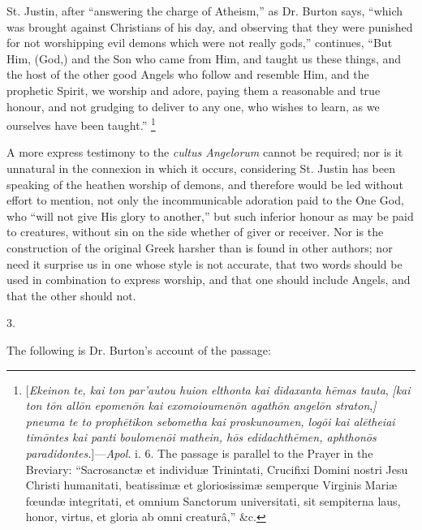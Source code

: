 St. Justin, after ``answering the charge of Atheism,'' as
Dr. Burton says, ``which was brought against Christians of his
day, and observing that they were punished for not worshipping evil
demons which were not really gods,'' continues, ``But Him,
(God,) and the Son who came from Him, and taught us these things, and
the host of the other good Angels who follow and resemble Him, and the
prophetic Spirit, we worship and adore, paying them a reasonable and
true honour, and not grudging to deliver to any one, who wishes to
learn, as we ourselves have been taught.'' \footnote{[\emph{Ekeinon te, kai ton par’autou huion
elthonta kai didaxanta h\={e}mas tauta}, \emph{[kai ton t\={o}n
all\={o}n epomen\={o}n kai exomoioumen\={o}n agath\={o}n
angel\={o}n straton},\emph{]} \emph{pneuma te to proph\={e}tikon
sebometha kai proskunoumen, log\={o}i kai al\={e}theiai tim\={o}ntes
kai panti boulomen\={o}i mathein, h\={o}s edidachth\={e}men,
aphthon\={o}s paradidontes.}]—\emph{Apol}.
i. 6. The passage is parallel to the Prayer in the Breviary: ``Sacrosanctæ
et individuæ Trinintati, Crucifixi Domini nostri Jesu Christi
humanitati, beatissimæ et gloriosissimæ semperque Virginis Mariæ fœundæ
integritati, et omnium Sanctorum universitati, sit sempiterna
laus, honor, virtus, et gloria ab omni creaturâ,'' \&c.}

A more express testimony to the \emph{cultus Angelorum} cannot
be
required; nor is it unnatural in the connexion in which it occurs,
considering St. Justin has been speaking of the heathen worship of
demons, and therefore would be led without effort to mention, not only
the incommunicable adoration paid to the One God, who ``will not
give His glory to another,'' but such inferior honour as may be
paid to creatures, without sin on the side whether of giver or
receiver. Nor is the construction of the original Greek harsher than
is found in other authors; nor need it surprise us in one whose style
is not accurate, that two words should be used in combination to
express worship, and that one should include Angels, and that the
other should not.

3.

The following is Dr. Burton's account of the passage:

